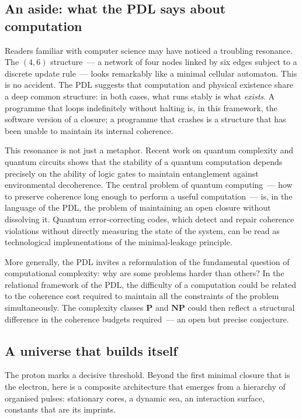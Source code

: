 \documentclass[12pt, a4paper, openright]{book}
\begin{document}
\subsection*{An aside: what the PDL says about computation}

Readers familiar with computer science may have noticed a troubling resonance. The $(4,6)$ structure~--- a network of four nodes linked by six edges subject to a discrete update rule~--- looks remarkably like a minimal cellular automaton. This is no accident. The PDL suggests that computation and physical existence share a deep common structure: in both cases, what runs stably is what \emph{exists}. A programme that loops indefinitely without halting is, in this framework, the software version of a closure; a programme that crashes is a structure that has been unable to maintain its internal coherence.

\medskip

This resonance is not just a metaphor. Recent work on quantum complexity and quantum circuits shows that the stability of a quantum computation depends precisely on the ability of logic gates to maintain entanglement against environmental decoherence. The central problem of quantum computing~--- how to preserve coherence long enough to perform a useful computation~--- is, in the language of the PDL, the problem of maintaining an open closure without dissolving it. Quantum error-correcting codes, which detect and repair coherence violations without directly measuring the state of the system, can be read as technological implementations of the minimal-leakage principle.

\medskip

\medskip

More generally, the PDL invites a reformulation of the fundamental question of computational complexity: why are some problems harder than others? In the relational framework of the PDL, the difficulty of a computation could be related to the coherence cost required to maintain all the constraints of the problem simultaneously. The complexity classes $\mathbf{P}$ and $\mathbf{NP}$ could then reflect a structural difference in the coherence budgets required~--- an open but precise conjecture.

\subsection*{A universe that builds itself}

The proton marks a decisive threshold. Beyond the first minimal closure that is the electron, here is a composite architecture that emerges from a hierarchy of organised pulses: stationary cores, a dynamic sea, an interaction surface, constants that are its imprints.
\end{document}
